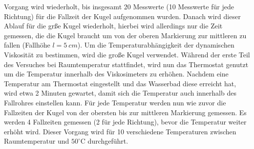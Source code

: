 Vorgang wird wiederholt, bis insgesamt 20 Messwerte (10 Messwerte für jede Richtung) für die Fallzeit der Kugel aufgenommen wurden. Danach wird dieser Ablauf für die grße Kugel 
wiederholt, hierbei wird allerdings nur die Zeit gemessen, die die Kugel braucht um von der oberen Markierung zur mittleren zu fallen (Fallhöhe $l = \SI{5}{cm}$). Um die Temperaturabhängigkeit der dynamischen Viskosität zu bestimmen, wird die große Kugel verwendet. Während der erste Teil des Versuches bei Raumtemperatur stattfindet, 
wird nun das Thermostat genutzt um die Temperatur innerhalb des Viskosimeters zu erhöhen. Nachdem eine Temperatur am Thermostat eingestellt und das Wasserbad diese erreicht hat, 
wird etwa 2 Minuten gewartet, damit sich die Temperatur auch innerhalb des Fallrohres einstellen kann. Für jede Temperatur werden nun wie zuvor die Fallzeiten der Kugel von der 
obersten bis zur mittleren Markierung gemessen. Es werden 4 Fallzeiten gemessen (2 für jede Richtung), bevor die Temperatur weiter erhöht wird. Dieser Vorgang wird für 10 
verschiedene Temperaturen zwischen Raumtemperatur und $50^\circ \text{C}$ durchgeführt.
